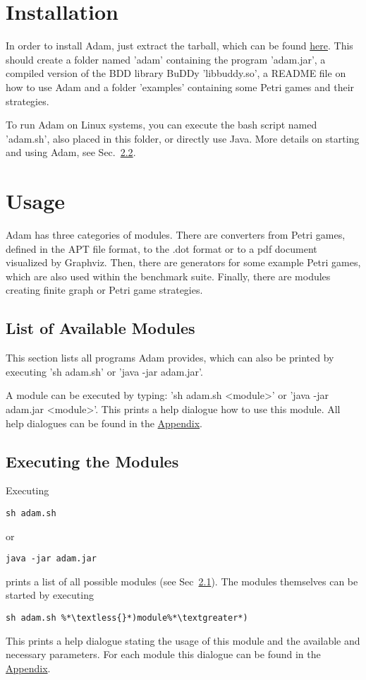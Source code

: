 \documentclass[runningheads]{./llncs/llncs}
\newcommand{\tool}{{\sc Adam}}
\begin{document}
\section{Installation}
In order to install \tool{}, just extract the tarball, which can be found \href{http://www.uni-oldenburg.de/csd/adam}{here}. This should create a folder named 'adam' containing the program 'adam.jar', a compiled version of the BDD library BuDDy
'libbuddy.so', a README file on how to use \tool{} and a folder 'examples' containing some Petri games and
their strategies.

To run \tool{} on Linux systems, you can execute the bash script named 'adam.sh', also
placed in this folder, or directly use Java. More details on starting and using \tool{}, see
Sec.~\ref{sec:exModules}.

\section{Usage}
\label{sec:usage}
\tool{} has three categories of modules. There are converters from Petri games,
defined in the APT file format, to the .dot format or to a pdf document visualized by
Graphviz. Then, there are generators for some example Petri games, which
are also used within the benchmark suite. Finally, there are modules creating finite 
graph or Petri game strategies.

\subsection{List of Available Modules}
\label{sec:modules}
This section lists all programs \tool{} provides, which can also be printed by executing  
         'sh adam.sh' or 'java -jar adam.jar'.



A module can be executed by typing: 'sh adam.sh \textless{}module\textgreater' or 'java -jar adam.jar \textless{}module\textgreater'.
This prints a help dialogue how to use this module. All help dialogues can be found in the \hyperref[sec:appendix]{Appendix}.

\subsection{Executing the Modules}
\label{sec:exModules}
Executing 
\begin{lstlisting}
sh adam.sh
\end{lstlisting}
or 
\begin{lstlisting}
java -jar adam.jar
\end{lstlisting}
prints a list of all possible modules (see Sec~\ref{sec:modules}). The modules themselves can be started by executing
\begin{lstlisting}
sh adam.sh %*\textless{}*)module%*\textgreater*)
\end{lstlisting}
This prints a help dialogue stating the usage of this module and the available and 
necessary parameters. For each module this dialogue can be found in the \hyperref[sec:appendix]{Appendix}.
\end{document}
